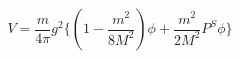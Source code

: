 \begin{equation}
V = \frac{m}{4 \pi}  g^{2} \{ ( 1 - \frac{m^{2}}{8M^{2}}) \phi
+ \frac{m^{2}}{2 M^{2}} P^{S} \phi \}       \label{eq:hn}
\end{equation}

